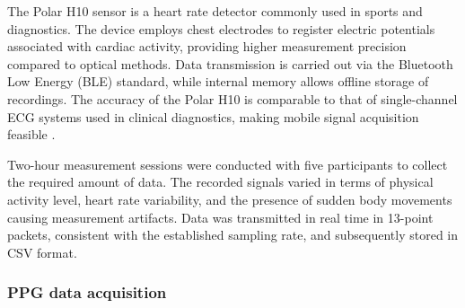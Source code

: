 \documentclass[journal]{IEEEtran}
\begin{document}
The Polar H10 sensor is a heart rate detector commonly used in sports and diagnostics. The device employs chest electrodes to register electric potentials associated with cardiac activity, providing higher measurement precision compared to optical methods. Data transmission is carried out via the Bluetooth Low Energy (BLE) standard, while internal memory allows offline storage of recordings. The accuracy of the Polar H10 is comparable to that of single-channel ECG systems used in clinical diagnostics, making mobile signal acquisition feasible \cite{21}.

Two-hour measurement sessions were conducted with five participants to collect the required amount of data. The recorded signals varied in terms of physical activity level, heart rate variability, and the presence of sudden body movements causing measurement artifacts. Data was transmitted in real time in 13-point packets, consistent with the established sampling rate, and subsequently stored in CSV format.


\subsubsection{PPG data acquisition}
\end{document}
